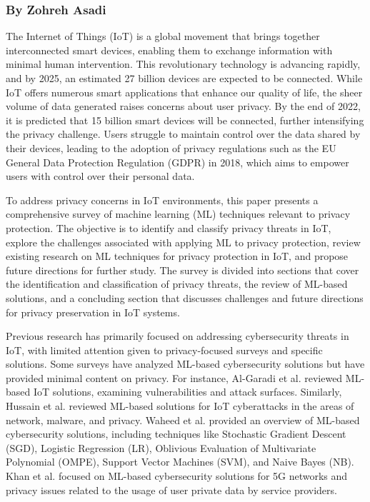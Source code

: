 \subsubsection{By Zohreh Asadi}

The Internet of Things (IoT) is a global movement that brings together interconnected smart devices, enabling them to exchange information with minimal human intervention. This revolutionary technology is advancing rapidly, and by 2025, an estimated 27 billion devices are expected to be connected. While IoT offers numerous smart applications that enhance our quality of life, the sheer volume of data generated raises concerns about user privacy. By the end of 2022, it is predicted that 15 billion smart devices will be connected, further intensifying the privacy challenge. Users struggle to maintain control over the data shared by their devices, leading to the adoption of privacy regulations such as the EU General Data Protection Regulation (GDPR) in 2018, which aims to empower users with control over their personal data.

To address privacy concerns in IoT environments, this paper presents a comprehensive survey of machine learning (ML) techniques relevant to privacy protection. The objective is to identify and classify privacy threats in IoT, explore the challenges associated with applying ML to privacy protection, review existing research on ML techniques for privacy protection in IoT, and propose future directions for further study. The survey is divided into sections that cover the identification and classification of privacy threats, the review of ML-based solutions, and a concluding section that discusses challenges and future directions for privacy preservation in IoT systems.

Previous research has primarily focused on addressing cybersecurity threats in IoT, with limited attention given to privacy-focused surveys and specific solutions. Some surveys have analyzed ML-based cybersecurity solutions but have provided minimal content on privacy. For instance, Al-Garadi et al. reviewed ML-based IoT solutions, examining vulnerabilities and attack surfaces. Similarly, Hussain et al. reviewed ML-based solutions for IoT cyberattacks in the areas of network, malware, and privacy. Waheed et al. provided an overview of ML-based cybersecurity solutions, including techniques like Stochastic Gradient Descent (SGD), Logistic Regression (LR), Oblivious Evaluation of Multivariate Polynomial (OMPE), Support Vector Machines (SVM), and Naive Bayes (NB). Khan et al. focused on ML-based cybersecurity solutions for 5G networks and privacy issues related to the usage of user private data by service providers.

